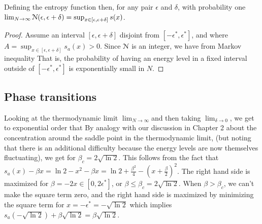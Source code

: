 \documentclass[letterpaper,english,10pt]{article}
\begin{document}
\begin{prop}
Defining the entropy function 
then, for any pair $\epsilon$ and $\delta$, with probability one 
$\lim_{N\to\infty}\mathcal{N}(\epsilon, \epsilon+\delta) = \sup_{x \in [\epsilon, \epsilon+\delta]}s(x)$.
\end{prop}
\begin{proof}
Assume an interval $[\epsilon, \epsilon+\delta]$ disjoint from $[-\epsilon^\ast, \epsilon^\ast]$, 
and 
where $A = \sup_{x \in [\epsilon, \epsilon+\delta]}s_a(x) > 0$. 
Since $\mathcal{N}$ is an integer, we have from Markov inequality 
That is, the probability of having an energy level in a fixed interval outside of $[-\epsilon^\ast, \epsilon^\ast]$ is exponentially small in $N$.
\end{proof}

\subsection{Phase transitions}
Looking at the thermodynamic limit $\lim_{N \to \infty}$and then taking $\lim_{\delta \to 0}$, 
we get to exponential order that
By analogy with our discussion in Chapter 2 about the concentration around the saddle
point in the thermodynamic limit, (but noting that there is an additional difficulty because the energy levels are now themselves fluctuating), we get
for $\beta_c = 2\sqrt{\ln2}$. 
This follows from the fact that $s_a(x)-\beta x = \ln2-x^2-\beta x = \ln 2 +\frac{\beta^2}{4}-\left(x+\frac{\beta}{2}\right)^2$. 
The right hand side is maximized for $\beta = -2x \in [0, 2\epsilon^\ast]$, or $\beta \le \beta_c = 2\sqrt{\ln2}$. 
When $\beta > \beta_c$, we can't make the square term zero, and the right hand side is maximized by minimizing the square term for $x = -\epsilon^\ast = -\sqrt{\ln2}$ which implies $s_a(-\sqrt{\ln2})+\beta\sqrt{\ln2} = \beta\sqrt{\ln2}$. 
\end{document}
